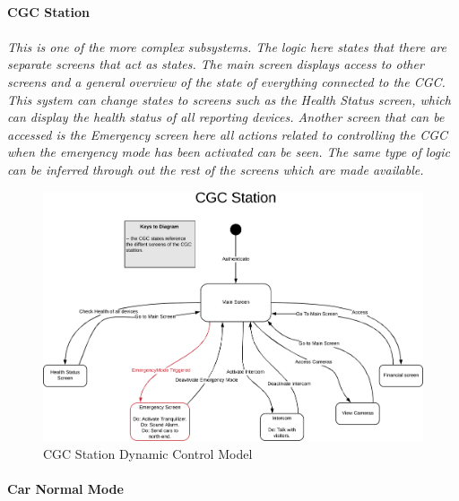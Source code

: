 \documentclass[12pt]{article}
\begin{document}
    \paragraph{CGC Station}
    \paragraph{}\textit{This is one of the more complex subsystems. The logic here states that there are separate screens that act as states. The main screen displays access to other screens 
    and a general overview of the state of everything connected to the CGC. This system can change states to screens such as the Health Status screen, which can display the health status of all reporting devices.
    Another screen that can be accessed is the Emergency screen here all actions related to controlling the CGC when the emergency mode has been activated can be seen. The same type of logic can be inferred through out the rest of the screens which are made available.}
    \begin{figure}[H]
         \centerline{\includegraphics[scale=0.80]{CGCStation.png}}
         \caption{CGC Station Dynamic Control Model}
          \label{fig:cgcstation}
    \end{figure}

    \paragraph{Car Normal Mode}
\end{document}
